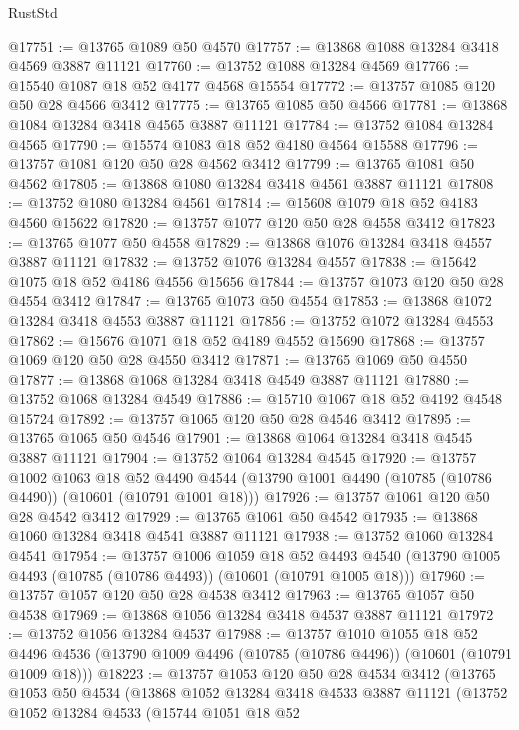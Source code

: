 \begin{lexlean}{RustStd}
\begin{coremodule}
@17751 := @13765 @1089 @50 @4570
@17757 := @13868 @1088 @13284 @3418 @4569 @3887 @11121
@17760 := @13752 @1088 @13284 @4569
@17766 := @15540 @1087 @18 @52 @4177 @4568 @15554
@17772 := @13757 @1085 @120 @50 @28 @4566 @3412
@17775 := @13765 @1085 @50 @4566
@17781 := @13868 @1084 @13284 @3418 @4565 @3887 @11121
@17784 := @13752 @1084 @13284 @4565
@17790 := @15574 @1083 @18 @52 @4180 @4564 @15588
@17796 := @13757 @1081 @120 @50 @28 @4562 @3412
@17799 := @13765 @1081 @50 @4562
@17805 := @13868 @1080 @13284 @3418 @4561 @3887 @11121
@17808 := @13752 @1080 @13284 @4561
@17814 := @15608 @1079 @18 @52 @4183 @4560 @15622
@17820 := @13757 @1077 @120 @50 @28 @4558 @3412
@17823 := @13765 @1077 @50 @4558
@17829 := @13868 @1076 @13284 @3418 @4557 @3887 @11121
@17832 := @13752 @1076 @13284 @4557
@17838 := @15642 @1075 @18 @52 @4186 @4556 @15656
@17844 := @13757 @1073 @120 @50 @28 @4554 @3412
@17847 := @13765 @1073 @50 @4554
@17853 := @13868 @1072 @13284 @3418 @4553 @3887 @11121
@17856 := @13752 @1072 @13284 @4553
@17862 := @15676 @1071 @18 @52 @4189 @4552 @15690
@17868 := @13757 @1069 @120 @50 @28 @4550 @3412
@17871 := @13765 @1069 @50 @4550
@17877 := @13868 @1068 @13284 @3418 @4549 @3887 @11121
@17880 := @13752 @1068 @13284 @4549
@17886 := @15710 @1067 @18 @52 @4192 @4548 @15724
@17892 := @13757 @1065 @120 @50 @28 @4546 @3412
@17895 := @13765 @1065 @50 @4546
@17901 := @13868 @1064 @13284 @3418 @4545 @3887 @11121
@17904 := @13752 @1064 @13284 @4545
@17920 := @13757
    @1002
    @1063
    @18
    @52
    @4490
    @4544
    (@13790 @1001 @4490 (@10785 (@10786 @4490)) (@10601 (@10791 @1001 @18)))
@17926 := @13757 @1061 @120 @50 @28 @4542 @3412
@17929 := @13765 @1061 @50 @4542
@17935 := @13868 @1060 @13284 @3418 @4541 @3887 @11121
@17938 := @13752 @1060 @13284 @4541
@17954 := @13757
    @1006
    @1059
    @18
    @52
    @4493
    @4540
    (@13790 @1005 @4493 (@10785 (@10786 @4493)) (@10601 (@10791 @1005 @18)))
@17960 := @13757 @1057 @120 @50 @28 @4538 @3412
@17963 := @13765 @1057 @50 @4538
@17969 := @13868 @1056 @13284 @3418 @4537 @3887 @11121
@17972 := @13752 @1056 @13284 @4537
@17988 := @13757
    @1010
    @1055
    @18
    @52
    @4496
    @4536
    (@13790 @1009 @4496 (@10785 (@10786 @4496)) (@10601 (@10791 @1009 @18)))
@18223 := @13757
    @1053
    @120
    @50
    @28
    @4534
    @3412
    (@13765
      @1053
      @50
      @4534
      (@13868
        @1052
        @13284
        @3418
        @4533
        @3887
        @11121
        (@13752
          @1052
          @13284
          @4533
          (@15744
            @1051
            @18
            @52

\end{coremodule}
\end{lexlean}
